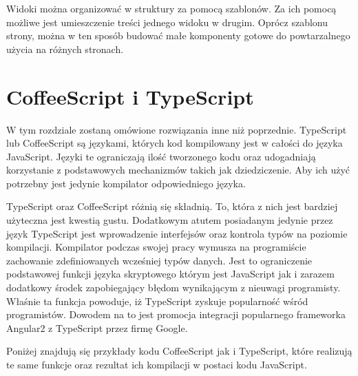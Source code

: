 Widoki można organizować w struktury za pomocą szablonów. Za ich pomocą możliwe jest umieszczenie treści jednego widoku w drugim. Oprócz szablonu strony, można w ten sposób budować małe komponenty gotowe do powtarzalnego użycia na różnych stronach.


\section{CoffeeScript i TypeScript}
W tym rozdziale zostaną omówione rozwiązania inne niż poprzednie. TypeScript lub CoffeeScript są językami, których kod kompilowany jest w całości do języka JavaScript\cite{typescript-book}. Języki te ograniczają ilość tworzonego kodu oraz udogadniają korzystanie z podstawowych mechanizmów takich jak dziedziczenie. Aby ich użyć potrzebny jest jedynie kompilator odpowiedniego języka.

TypeScript oraz CoffeeScript różnią się składnią. To, która z nich jest bardziej użyteczna jest kwestią gustu. Dodatkowym atutem posiadanym jedynie przez język TypeScript jest wprowadzenie interfejsów oraz kontrola typów na poziomie kompilacji. Kompilator podczas swojej pracy wymusza na programiście zachowanie zdefiniowanych wcześniej typów danych. Jest to ograniczenie podstawowej funkcji języka skryptowego którym jest JavaScript jak i zarazem dodatkowy środek zapobiegający błędom wynikającym z nieuwagi programisty. Właśnie ta funkcja powoduje, iż TypeScript zyskuje popularność wśród programistów. Dowodem na to jest promocja integracji popularnego frameworka Angular2 z TypeScript przez firmę Google\cite{angular2-site}.

Poniżej znajdują się przykłady kodu CoffeeScript jak i TypeScript, które realizują te same funkcje oraz rezultat ich kompilacji w postaci kodu JavaScript. 
 
